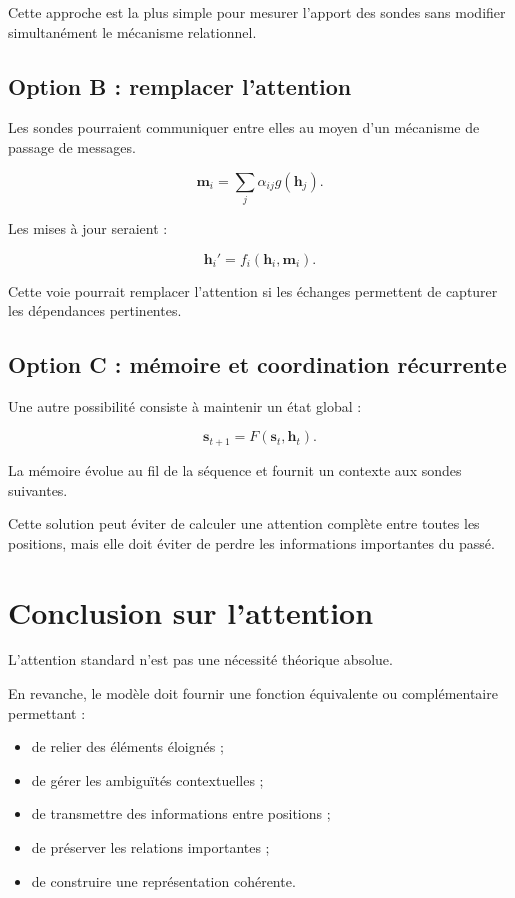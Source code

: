 \documentclass[11pt,a4paper]{report}
\newcommand{\vect}[1]{\bm{#1}}
\begin{document}
Cette approche est la plus simple pour mesurer
l'apport des sondes sans modifier simultanément
le mécanisme relationnel.

\subsection{Option B : remplacer l'attention}

Les sondes pourraient communiquer entre elles
au moyen d'un mécanisme de passage de messages.

\[
\vect{m}_i
=
\sum_j
\alpha_{ij}g(\vect{h}_j).
\]

Les mises à jour seraient :

\[
\vect{h}_i'
=
f_i(\vect{h}_i,\vect{m}_i).
\]

Cette voie pourrait remplacer l'attention si les échanges
permettent de capturer les dépendances pertinentes.

\subsection{Option C : mémoire et coordination récurrente}

Une autre possibilité consiste à maintenir un état global :

\[
\vect{s}_{t+1}
=
F(\vect{s}_t,\vect{h}_t).
\]

La mémoire évolue au fil de la séquence et fournit
un contexte aux sondes suivantes.

Cette solution peut éviter de calculer une attention
complète entre toutes les positions, mais elle doit
éviter de perdre les informations importantes du passé.

\section{Conclusion sur l'attention}

L'attention standard n'est pas une nécessité théorique
absolue.

En revanche, le modèle doit fournir une fonction équivalente
ou complémentaire permettant :

\begin{itemize}
  \item de relier des éléments éloignés ;
  \item de gérer les ambiguïtés contextuelles ;
  \item de transmettre des informations entre positions ;
  \item de préserver les relations importantes ;
  \item de construire une représentation cohérente.
\end{itemize}
\end{document}
